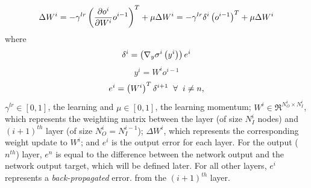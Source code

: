 		\begin{equation}
			\Delta W^{i} =
				-\gamma^{lr} \left( \frac{ \partial o^{i} }{\partial {W^{i} } }  o^{i-1} \right)^{T}  + \mu \Delta W^{i} = 
				-\gamma^{lr} \delta^{i} \left(o^{i-1}\right)^{T}  + \mu \Delta W^{i}
			\label{eq::bp_weight_update}
		\end{equation} 
		where
		\begin{equation*}
			\delta^{i} = \left( \nabla_{y} \sigma^{i}\left(y^{i}\right) \right) e^{i}
			\label{eq::bp_error}
		\end{equation*}
		\begin{equation*}
			y^{i} = W^{i} o^{i-1}
			\label{eq::bp_error}
		\end{equation*}
		\begin{equation*}
			e^{i} =  \left( W^{i} \right)^{T} \delta^{i+1} \hspace{2mm} \forall \hspace{2mm} i\neq n,
		\end{equation*}
		$\gamma^{lr} \in [0,1]$, the learning and  $\mu \in [0,1]$, the learning momentum; $W^{i} \in \Re^{N_{O}^{i}\times N_{I}^{i}}$, which represents the weighting matrix between the \Ith layer (of size $N_{I}^{i}$ nodes) and $(i+1)^{th}$ layer (of size $N_{O}^{i}=N_{I}^{i-1}$); $\Delta W^{i}$, which represents the corresponding weight update to $W^{i}$; and $e^{i}$ is the output error for each \Ith layer. For the output ($n^{th}$) layer, $e^{n}$ is equal to the difference between the network output and the network output target, which will be defined later. For all other layers, $e^{i}$ represents a \emph{back-propagated} error. from the $(i+1)^{th}$ layer.

